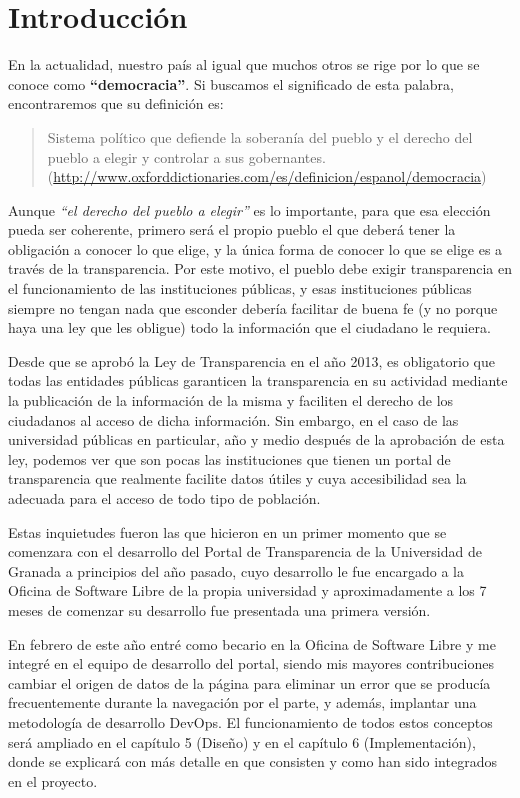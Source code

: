 \chapter{Introducción}

En la actualidad, nuestro país al igual que muchos otros se rige por lo que se conoce como \textbf{``democracia''}. Si buscamos
el significado de esta palabra, encontraremos que su definición es: 

\begin{quote}Sistema político que defiende la soberanía del pueblo y el derecho del pueblo a elegir y controlar a sus gobernantes.
\newline(\url{http://www.oxforddictionaries.com/es/definicion/espanol/democracia})
\end{quote}

Aunque \textit{``el derecho del pueblo a elegir''} es lo importante, para que esa elección pueda ser coherente, primero será el propio pueblo el que deberá tener la obligación a conocer lo que elige, y la única forma de conocer lo que se elige es a través de la transparencia. Por este motivo, el pueblo debe exigir transparencia en el funcionamiento de las instituciones públicas, y esas instituciones públicas siempre no tengan nada que esconder debería facilitar de buena fe (y no porque haya una ley que les obligue) todo la información que el ciudadano le requiera.

\bigskip
Desde que se aprobó la Ley de Transparencia en el año 2013, es obligatorio que todas las entidades públicas garanticen la transparencia en su actividad mediante la publicación de la información de la misma y faciliten el derecho de los ciudadanos al acceso de dicha información. Sin embargo, en el caso de las universidad públicas en particular, año y medio después de la aprobación de esta ley, podemos ver que son pocas las instituciones que tienen un portal de transparencia que realmente facilite datos útiles y cuya accesibilidad sea la adecuada para el acceso de todo tipo de población.

\bigskip
Estas inquietudes fueron las que hicieron en un primer momento que se comenzara con el desarrollo del Portal de Transparencia de la Universidad de Granada a principios del año pasado, cuyo desarrollo le fue encargado a la Oficina de Software Libre de la propia universidad y aproximadamente a los 7 meses de comenzar su desarrollo fue presentada una primera versión.

\bigskip
En febrero de este año entré como becario en la Oficina de Software Libre y me integré en el equipo de desarrollo del portal, siendo mis mayores contribuciones cambiar el origen de datos de la página para eliminar un error que se producía frecuentemente durante la navegación por el parte, y además, implantar una metodología de desarrollo DevOps. El funcionamiento de todos estos conceptos será ampliado en el capítulo 5 (Diseño) y en el capítulo 6 (Implementación), donde se explicará con más detalle en que consisten y como han sido integrados en el proyecto.

